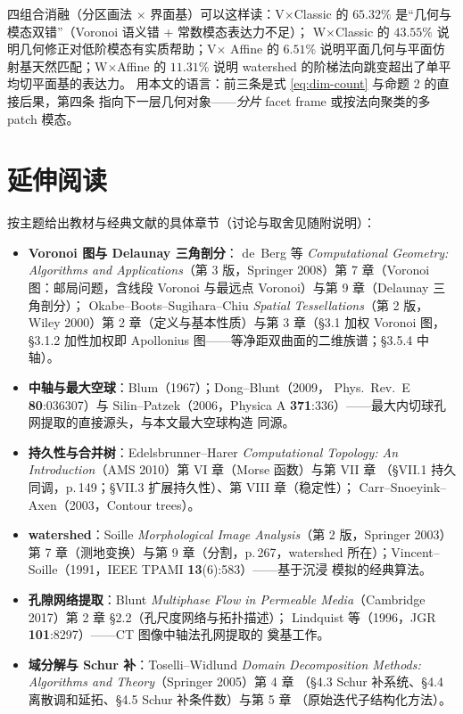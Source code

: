 \documentclass[UTF8,zihao=-4]{ctexart}
\begin{document}
四组合消融（分区画法 $\times$ 界面基）可以这样读：V$\times$Classic 的
$65.32\%$ 是``几何与模态双错''（Voronoi 语义错 + 常数模态表达力不足）；
W$\times$Classic 的 $43.55\%$ 说明几何修正对低阶模态有实质帮助；V$\times$
Affine 的 $6.51\%$ 说明平面几何与平面仿射基天然匹配；W$\times$Affine 的
$11.31\%$ 说明 watershed 的阶梯法向跳变超出了单平均切平面基的表达力。
用本文的语言：前三条是式 \eqref{eq:dim-count} 与命题 2 的直接后果，第四条
指向下一层几何对象——\emph{分片} facet frame 或按法向聚类的多 patch 模态。

\section{延伸阅读}

按主题给出教材与经典文献的具体章节（讨论与取舍见随附说明）：

\begin{itemize}
  \item \textbf{Voronoi 图与 Delaunay 三角剖分}：
  de~Berg 等 \emph{Computational Geometry: Algorithms and Applications}（第 3
  版，Springer 2008）第 7 章（Voronoi 图：邮局问题，含线段 Voronoi 与最远点
  Voronoi）与第 9 章（Delaunay 三角剖分）；
  Okabe--Boots--Sugihara--Chiu \emph{Spatial Tessellations}（第 2 版，Wiley
  2000）第 2 章（定义与基本性质）与第 3 章（\S3.1 加权 Voronoi 图，
  \S3.1.2 加性加权即 Apollonius 图——等净距双曲面的二维族谱；\S3.5.4 中轴）。
  \item \textbf{中轴与最大空球}：Blum（1967）；Dong--Blunt（2009，
  Phys.~Rev.~E \textbf{80}:036307）与 Silin--Patzek（2006，Physica A
  \textbf{371}:336）——最大内切球孔网提取的直接源头，与本文最大空球构造
  同源。
  \item \textbf{持久性与合并树}：Edelsbrunner--Harer \emph{Computational
  Topology: An Introduction}（AMS 2010）第 VI 章（Morse 函数）与第 VII 章
  （\S VII.1 持久同调，p.\,149；\S VII.3 扩展持久性）、第 VIII 章（稳定性）；
  Carr--Snoeyink--Axen（2003，Contour trees）。
  \item \textbf{watershed}：Soille \emph{Morphological Image Analysis}（第 2
  版，Springer 2003）第 7 章（测地变换）与第 9 章（分割，p.\,267，watershed
  所在）；Vincent--Soille（1991，IEEE TPAMI \textbf{13}(6):583）——基于沉浸
  模拟的经典算法。
  \item \textbf{孔隙网络提取}：Blunt \emph{Multiphase Flow in Permeable
  Media}（Cambridge 2017）第 2 章 \S2.2（孔尺度网络与拓扑描述）；
  Lindquist 等（1996，JGR \textbf{101}:8297）——CT 图像中轴法孔网提取的
  奠基工作。
  \item \textbf{域分解与 Schur 补}：Toselli--Widlund \emph{Domain
  Decomposition Methods: Algorithms and Theory}（Springer 2005）第 4 章
  （\S4.3 Schur 补系统、\S4.4 离散调和延拓、\S4.5 Schur 补条件数）与第 5 章
  （原始迭代子结构化方法）。
\end{itemize}
\end{document}
